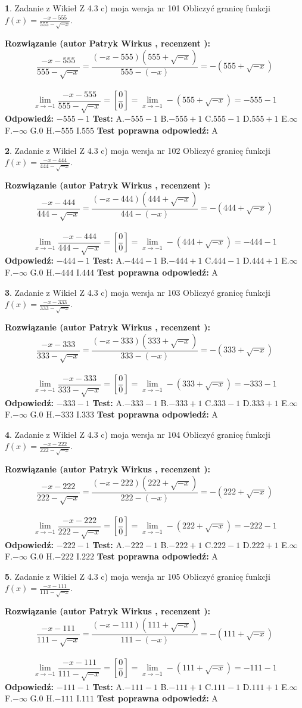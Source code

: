 \documentclass[12pt, a4paper]{article}
\theoremstyle{definition} %
\newtheorem{zad}{}
\newcommand{\zadStart}[1]{\begin{zad}#1\newline}
\newcommand{\zadStop}{\end{zad}}
\newcommand{\rozwStart}[2]{\noindent \textbf{Rozwiązanie (autor #1 , recenzent #2): }\newline}
\newcommand{\rozwStop}{\newline}
\newcommand{\odpStart}{\noindent \textbf{Odpowiedź:}\newline}
\newcommand{\odpStop}{\newline}
\newcommand{\testStart}{\noindent \textbf{Test:}\newline}
\newcommand{\testStop}{\newline}
\newcommand{\kluczStart}{\noindent \textbf{Test poprawna odpowiedź:}\newline}
\newcommand{\kluczStop}{\newline}
\begin{document}
\zadStart{Zadanie z Wikieł Z 4.3 c) moja wersja nr 101}
Obliczyć granicę funkcji $f(x)=\frac{-x-555}{555-\sqrt{-x}}$.
\zadStop
\rozwStart{Patryk Wirkus}{}
$$\frac{-x-555}{555-\sqrt{-x}}=\frac{(-x-555)(555+\sqrt{-x})}{555-(-x)}=-(555+\sqrt{-x})$$
\\
$$\lim\limits_{x\to-1}\frac{-x-555}{555-\sqrt{-x}}=[\frac{0}{0}]=\lim\limits_{x\to-1}-(555+\sqrt{-x}) =-555-1$$
\rozwStop
\odpStart
$-555-1$
\odpStop
\testStart
A.$-555-1$
B.$-555+1$
C.$555-1$
D.$555+1$
E.$\infty$
F.$-\infty$
G.$0$
H.$-555$
I.$555$
\testStop
\kluczStart
A
\kluczStop



\zadStart{Zadanie z Wikieł Z 4.3 c) moja wersja nr 102}
Obliczyć granicę funkcji $f(x)=\frac{-x-444}{444-\sqrt{-x}}$.
\zadStop
\rozwStart{Patryk Wirkus}{}
$$\frac{-x-444}{444-\sqrt{-x}}=\frac{(-x-444)(444+\sqrt{-x})}{444-(-x)}=-(444+\sqrt{-x})$$
\\
$$\lim\limits_{x\to-1}\frac{-x-444}{444-\sqrt{-x}}=[\frac{0}{0}]=\lim\limits_{x\to-1}-(444+\sqrt{-x}) =-444-1$$
\rozwStop
\odpStart
$-444-1$
\odpStop
\testStart
A.$-444-1$
B.$-444+1$
C.$444-1$
D.$444+1$
E.$\infty$
F.$-\infty$
G.$0$
H.$-444$
I.$444$
\testStop
\kluczStart
A
\kluczStop



\zadStart{Zadanie z Wikieł Z 4.3 c) moja wersja nr 103}
Obliczyć granicę funkcji $f(x)=\frac{-x-333}{333-\sqrt{-x}}$.
\zadStop
\rozwStart{Patryk Wirkus}{}
$$\frac{-x-333}{333-\sqrt{-x}}=\frac{(-x-333)(333+\sqrt{-x})}{333-(-x)}=-(333+\sqrt{-x})$$
\\
$$\lim\limits_{x\to-1}\frac{-x-333}{333-\sqrt{-x}}=[\frac{0}{0}]=\lim\limits_{x\to-1}-(333+\sqrt{-x}) =-333-1$$
\rozwStop
\odpStart
$-333-1$
\odpStop
\testStart
A.$-333-1$
B.$-333+1$
C.$333-1$
D.$333+1$
E.$\infty$
F.$-\infty$
G.$0$
H.$-333$
I.$333$
\testStop
\kluczStart
A
\kluczStop



\zadStart{Zadanie z Wikieł Z 4.3 c) moja wersja nr 104}
Obliczyć granicę funkcji $f(x)=\frac{-x-222}{222-\sqrt{-x}}$.
\zadStop
\rozwStart{Patryk Wirkus}{}
$$\frac{-x-222}{222-\sqrt{-x}}=\frac{(-x-222)(222+\sqrt{-x})}{222-(-x)}=-(222+\sqrt{-x})$$
\\
$$\lim\limits_{x\to-1}\frac{-x-222}{222-\sqrt{-x}}=[\frac{0}{0}]=\lim\limits_{x\to-1}-(222+\sqrt{-x}) =-222-1$$
\rozwStop
\odpStart
$-222-1$
\odpStop
\testStart
A.$-222-1$
B.$-222+1$
C.$222-1$
D.$222+1$
E.$\infty$
F.$-\infty$
G.$0$
H.$-222$
I.$222$
\testStop
\kluczStart
A
\kluczStop



\zadStart{Zadanie z Wikieł Z 4.3 c) moja wersja nr 105}
Obliczyć granicę funkcji $f(x)=\frac{-x-111}{111-\sqrt{-x}}$.
\zadStop
\rozwStart{Patryk Wirkus}{}
$$\frac{-x-111}{111-\sqrt{-x}}=\frac{(-x-111)(111+\sqrt{-x})}{111-(-x)}=-(111+\sqrt{-x})$$
\\
$$\lim\limits_{x\to-1}\frac{-x-111}{111-\sqrt{-x}}=[\frac{0}{0}]=\lim\limits_{x\to-1}-(111+\sqrt{-x}) =-111-1$$
\rozwStop
\odpStart
$-111-1$
\odpStop
\testStart
A.$-111-1$
B.$-111+1$
C.$111-1$
D.$111+1$
E.$\infty$
F.$-\infty$
G.$0$
H.$-111$
I.$111$
\testStop
\kluczStart
A
\kluczStop
\end{document}
